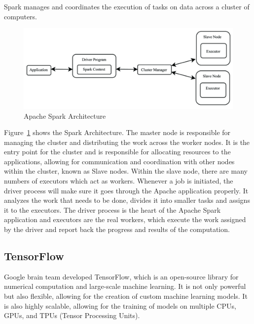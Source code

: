 Spark manages and coordinates the execution of tasks on data across a cluster of computers.

\begin{figure}[H]
    \centering
    \includegraphics[width=1\linewidth]{images/Spark_Arch.png}
    \caption{Apache Spark Architecture}
    \label{fig:spark-arch}
\end{figure}

Figure~\ref{fig:spark-arch} shows the Spark Architecture. The master node is responsible for managing the cluster and distributing the work across the worker nodes. It is the entry point
for the cluster and is responsible for allocating resources to the applications, allowing for communication and coordination with other nodes within the cluster, known as Slave nodes. 
Within the slave node, there are many numbers of executors which act as workers. Whenever a job is initiated, the driver process will make sure it goes through the Apache application properly. 
It analyzes the work that needs to be done, divides it into smaller tasks and assigns it to the executors. The driver process is the heart of the Apache Spark application and executors are the 
real workers, which execute the work assigned by the driver and report back the progress and results of the computation.\cite{8988541}


\subsection{TensorFlow}
Google brain team developed TensorFlow, which is an open-source library for numerical computation and large-scale machine learning.  It is not only powerful but also flexible, allowing for 
the creation of custom machine learning models. It is also highly scalable, allowing for the training of models on multiple CPUs, GPUs, and TPUs (Tensor Processing Units).\cite{tensorflow}


